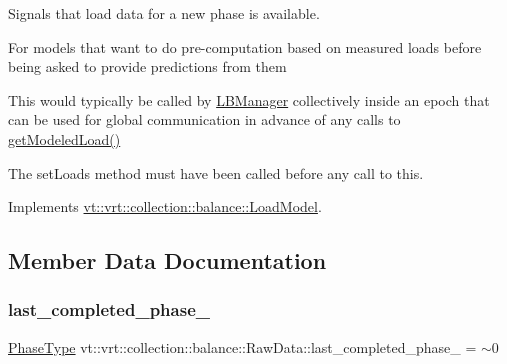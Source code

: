 Signals that load data for a new phase is available. 

For models that want to do pre-\/computation based on measured loads before being asked to provide predictions from them

This would typically be called by \hyperlink{structvt_1_1vrt_1_1collection_1_1balance_1_1_l_b_manager}{L\+B\+Manager} collectively inside an epoch that can be used for global communication in advance of any calls to \hyperlink{structvt_1_1vrt_1_1collection_1_1balance_1_1_raw_data_a94b4d28a0a5024753cc382c9d1a0632d}{get\+Modeled\+Load()}

The {\ttfamily set\+Loads} method must have been called before any call to this. 

Implements \hyperlink{structvt_1_1vrt_1_1collection_1_1balance_1_1_load_model_a4f1c6fb5d7d7a0b147755f025b1d5f5c}{vt\+::vrt\+::collection\+::balance\+::\+Load\+Model}.



\subsection{Member Data Documentation}
\mbox{\label{structvt_1_1vrt_1_1collection_1_1balance_1_1_raw_data_a9ceb9cf1dd88772821658e506d015397}} 
\subsubsection{\texorpdfstring{last\+\_\+completed\+\_\+phase\+\_\+}{last\_completed\_phase\_}}
{\footnotesize\ttfamily \hyperlink{namespacevt_a46ce6733d5cdbd735d561b7b4029f6d7}{Phase\+Type} vt\+::vrt\+::collection\+::balance\+::\+Raw\+Data\+::last\+\_\+completed\+\_\+phase\+\_\+ = $\sim$0}

\mbox{\label{structvt_1_1vrt_1_1collection_1_1balance_1_1_raw_data_a1e350ebf1bd9b3c94fdbc371779b8832}} 
